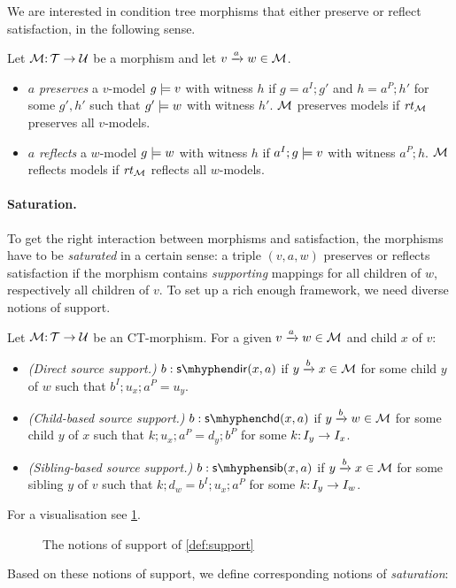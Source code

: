 We are interested in condition tree morphisms that either preserve or reflect satisfaction, in the following sense.

\begin{definition}
Let ${\mathcal{M}}{:}\, {\mathcal{T}}\rightarrow{\mathcal{U}}$ be a morphism and let ${v}\xrightarrow{a}{w}\in{\mathcal{M}}$.
\begin{itemize}[topsep=\smallskipamount]
\item $a$ \emph{preserves} a $v$-model $g\models v$ with witness $h$ if $g=a^I;g'$ and $h=a^P;h'$ for some $g',h'$ such that $g'\models w$ with witness $h'$. ${\mathcal{M}}$ preserves models if $\mathit{rt}_{{\mathcal{M}}}$ preserves all $v$-models.
\item $a$ \emph{reflects} a $w$-model $g\models w$ with witness $h$ if $a^I;g\models v$ with witness $a^P;h$. ${\mathcal{M}}$ reflects models if $\mathit{rt}_{{\mathcal{M}}}$ reflects all $w$-models. 
\end{itemize}
\end{definition}

\paragraph{Saturation.}

To get the right interaction between morphisms and satisfaction, the morphisms have to be \emph{saturated} in a certain sense: a triple $(v,a,w)$ preserves or reflects satisfaction if the morphism contains \emph{supporting} mappings for all children of $w$, respectively all children of $v$. To set up a rich enough framework, we need diverse notions of support.

\begin{definition}\label{def:support}
Let ${\mathcal{M}}{:}\, {\mathcal{T}}\rightarrow{\mathcal{U}}$ be an CT-morphism. For a given ${v}\xrightarrow{a}{w}\in{\mathcal{M}}$ and child $x$ of $v$:
\begin{itemize}[topsep=\smallskipamount]
\item \emph{(Direct source support.)} $\issdir b{x,a}$ if ${y}\xrightarrow{b}{x}\in{\mathcal{M}}$ for some child $y$ of $w$ such that $b^I;u_x;a^P=u_y$.
\item \emph{(Child-based source support.)} $\isschd b{x,a}$ if ${y}\xrightarrow{b}{w}\in{\mathcal{M}}$ for some child $y$ of $x$ such that $k;u_x;a^P=d_y;b^P$ for some $k{:}\, I_y\rightarrow I_x$.
\item \emph{(Sibling-based source support.)} $\isssib b{x,a}$ if ${y}\xrightarrow{b}{x}\in{\mathcal{M}}$ for some sibling $y$ of $v$ such that $k;d_w=b^I;u_x;a^P$ for some $k{:}\, I_y\rightarrow I_w$.
\end{itemize}
\end{definition}
%
For a visualisation see \cref{fig:source-saturation}.
%
\begin{figure}
	
	\caption{The notions of support of \cref{def:support}}
	\label{fig:source-saturation}
\end{figure}
%
Based on these notions of support, we define corresponding notions of \emph{saturation}:

